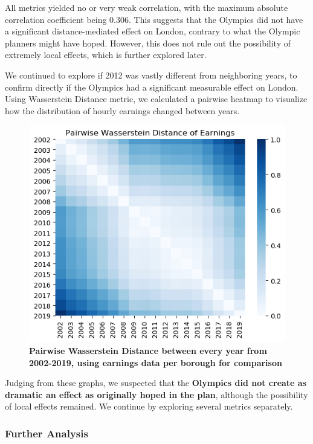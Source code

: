 \documentclass[11pt, twocolumn]{article}
\begin{document}
All metrics yielded no or very weak correlation, with the maximum absolute correlation coefficient being 0.306. This suggests that the Olympics did not have a significant distance-mediated effect on London, contrary to what the Olympic planners might have hoped. However, this does not rule out the possibility of extremely local effects, which is further explored later.
\bigskip

We continued to explore if 2012 was vastly different from neighboring years, to confirm directly if the Olympics had a significant measurable effect on London. Using Wasserstein Distance metric, we calculated a pairwise heatmap to visualize how the distribution of hourly earnings changed between years.

\begin{figure}[H]
    \centering
        \includegraphics[scale=0.7]{justincome.png}
    \caption{\textbf{Pairwise Wasserstein Distance between every year from 2002-2019, using earnings data per borough for comparison}}
    \label{fig:earning_heatmap}
\end{figure}

Judging from these graphs, we suspected that the \textbf{Olympics did not create as dramatic an effect as originally hoped in the plan}, although the possibility of local effects remained. We continue by exploring several metrics separately.

\subsubsection{Further Analysis}
\end{document}
